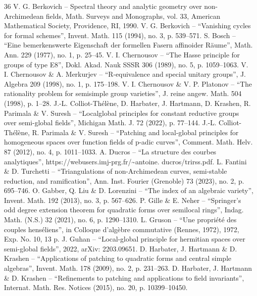\begin{thebibliography}{36}
 V. G. Berkovich – Spectral theory and analytic geometry over non-Archimedean fields, Math. Surveys and Monographs, vol. 33, American Mathematical Society, Providence, RI, 1990.
 V. G. Berkovich – “Vanishing cycles for formal schemes”, Invent. Math. 115 (1994), no. 3, p. 539–571.
 S. Bosch – “Eine bemerkenswerte Eigenschaft der formellen Fasern affinoider Räume”, Math. Ann. 229 (1977), no. 1, p. 25–45.
 V. I. Chernousov – “The Hasse principle for groups of type E8”, Dokl. Akad. Nauk SSSR 306 (1989), no. 5, p. 1059–1063.
 V. I. Chernousov \& A. Merkurjev – “R-equivalence and special unitary groups”, J. Algebra 209 (1998), no. 1, p. 175–198.
 V. I. Chernousov \& V. P. Platonov – “The rationality problem for semisimple group varieties”, J. reine angew. Math. 504 (1998), p. 1–28.
 J.-L. Colliot-Thélène, D. Harbater, J. Hartmann, D. Krashen, R. Parimala \& V. Suresh – “Localglobal principles for constant reductive groups over semi-global fields”, Michigan Math. J. 72 (2022), p. 77–144.
 J.-L. Colliot-Thélène, R. Parimala \& V. Suresh – “Patching and local-global principles for homogeneous spaces over function fields of p-adic curves”, Comment. Math. Helv. 87 (2012), no. 4, p. 1011–1033.
 A. Ducros – “La structure des courbes analytiques”, https://webusers.imj-prg.fr/\textasciitilde{}antoine. ducros/trirss.pdf.
 L. Fantini \& D. Turchetti – “Triangulations of non-Archimedean curves, semi-stable reduction, and ramification”, Ann. Inst. Fourier (Grenoble) 73 (2023), no. 2, p. 695–746.
 O. Gabber, Q. Liu \& D. Lorenzini – “The index of an algebraic variety”, Invent. Math. 192 (2013), no. 3, p. 567–626.
 P. Gille \& E. Neher – “Springer’s odd degree extension theorem for quadratic forms over semilocal rings”, Indag. Math. (N.S.) 32 (2021), no. 6, p. 1290–1310.
 L. Gruson – “Une propriété des couples henséliens”, in Colloque d’algèbre commutative (Rennes, 1972), 1972, Exp. No. 10, 13 p.
 J. Guhan – “Local-global principle for hermitian spaces over semi-global fields”, 2022, arXiv: 2203.09651.
 D. Harbater, J. Hartmann \& D. Krashen – “Applications of patching to quadratic forms and central simple algebras”, Invent. Math. 178 (2009), no. 2, p. 231–263.
 D. Harbater, J. Hartmann \& D. Krashen – “Refinements to patching and applications to field invariants”, Internat. Math. Res. Notices (2015), no. 20, p. 10399–10450.

\end{thebibliography}
